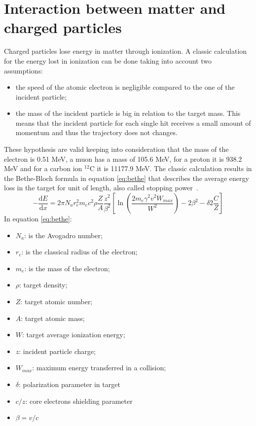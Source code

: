 \section{Interaction between matter and charged particles}
Charged particles
lose energy in matter through ionization.
A classic calculation for the energy lost in ionization can be done taking into account two assumptions:
\begin{itemize}
	\item the speed of the atomic electron is negligible compared to the one of the incident particle;
	\item the mass of the incident particle is big in relation to the target mass.
	This means that the incident particle for each single hit receives a small amount of momentum and thus the trajectory does not changes.  
\end{itemize}
\noindent These hypothesis are valid keeping into consideration that the mass of the electron is 0.51 MeV, a muon has a mass of 105.6 MeV, for a proton it is 938.2 MeV and for a carbon ion ${}^{12}$C it is 11177.9 MeV.
\newline
The classic calculation results in the Bethe-Bloch formula in equation \ref{eq:bethe} that describes the average energy loss in the target for unit of length, also called stopping power~\cite{PDG}.
\begin{equation}\label{eq:bethe}
	-\dfrac{\mathrm dE}{\mathrm dx} = 2 \pi N_{a} r_{e}^{2} m_{e} c^{2} \rho \dfrac{Z}{A}  \dfrac{z^{2}}{\beta^{2}}\left[\ln\left(\dfrac{2m_{e} \gamma ^{2} v^{2} W_{max}}{W^{2}}\right) - 2\beta^{2} - \delta 2\frac{C}{Z}\right]
\end{equation}
\noindent In equation \ref{eq:bethe}:
\begin{itemize}
	\item $N_a$: is the Avogadro number;
	\item $r_e$: is the classical radius of the electron;
	\item $m_e$: is the mass of the electron;
	\item $\rho$: target density;
	\item $Z $: target atomic number;
	\item $A $: target atomic mass;
	\item $W $: target average ionization energy;
	\item $z $: incident particle charge;
	\item $W_{max} $: maximum energy transferred in a collision; 
	\item $\delta $: polarization parameter in target
	\item $c/z $: core electrons shielding parameter 
	\item $\beta = v/c $
\end{itemize}
